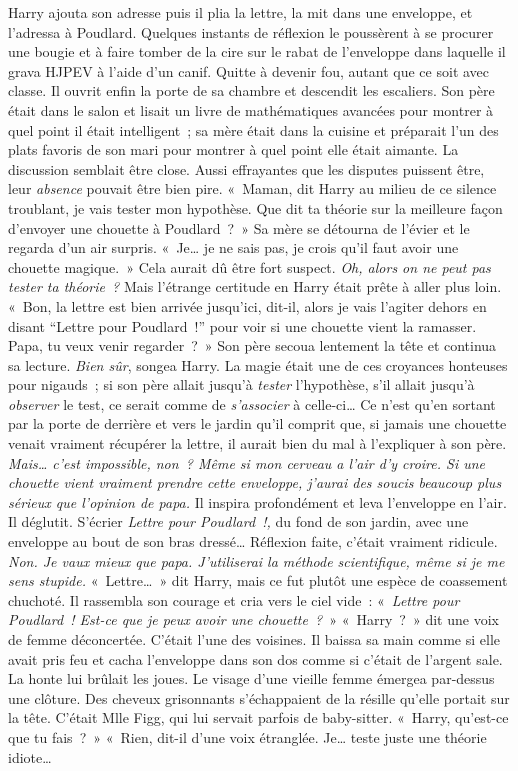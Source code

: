 Harry ajouta son adresse puis il plia la lettre, la mit dans une enveloppe, et l'adressa à Poudlard. Quelques instants de réflexion le poussèrent à se procurer une bougie et à faire tomber de la cire sur le rabat de l'enveloppe dans laquelle il grava HJPEV à l'aide d'un canif. Quitte à devenir fou, autant que ce soit avec classe.
Il ouvrit enfin la porte de sa chambre et descendit les escaliers. Son père était dans le salon et lisait un livre de mathématiques avancées pour montrer à quel point il était intelligent~; sa mère était dans la cuisine et préparait l'un des plats favoris de son mari pour montrer à quel point elle était aimante. La discussion semblait être close. Aussi effrayantes que les disputes puissent être, leur \emph{absence} pouvait être bien pire.
«~Maman, dit Harry au milieu de ce silence troublant, je vais tester mon hypothèse. Que dit ta théorie sur la meilleure façon d'envoyer une chouette à Poudlard~?~»
Sa mère se détourna de l'évier et le regarda d'un air surpris. «~Je… je ne sais pas, je crois qu'il faut avoir une chouette magique.~»
Cela aurait dû être fort suspect. \emph{Oh, alors on ne peut pas tester ta théorie~?} Mais l'étrange certitude en Harry était prête à aller plus loin.
«~Bon, la lettre est bien arrivée jusqu'ici, dit-il, alors je vais l'agiter dehors en disant “Lettre pour Poudlard~!” pour voir si une chouette vient la ramasser. Papa, tu veux venir regarder~?~»
Son père secoua lentement la tête et continua sa lecture. \emph{Bien sûr}, songea Harry. La magie était une de ces croyances honteuses pour nigauds~; si son père allait jusqu'à \emph{tester} l'hypothèse, s'il allait jusqu'à \emph{observer} le test, ce serait comme de \emph{s'associer} à celle-ci…
Ce n'est qu'en sortant par la porte de derrière et vers le jardin qu'il comprit que, si jamais une chouette venait vraiment récupérer la lettre, il aurait bien du mal à l'expliquer à son père.
\emph{Mais… c'est impossible, non~? Même si mon cerveau a l'air d'y croire. Si une chouette vient vraiment prendre cette enveloppe, j'aurai des soucis beaucoup plus sérieux que l'opinion de papa.}
Il inspira profondément et leva l'enveloppe en l'air.
Il déglutit.
S'écrier \emph{Lettre pour Poudlard~!,} du fond de son jardin, avec une enveloppe au bout de son bras dressé… Réflexion faite, c'était vraiment ridicule.
\emph{Non. Je vaux mieux que papa. J'utiliserai la méthode scientifique, même si je me sens stupide.}
«~Lettre…~» dit Harry, mais ce fut plutôt une espèce de coassement chuchoté.
Il rassembla son courage et cria vers le ciel vide~: «~\emph{Lettre pour Poudlard~! Est-ce que je peux avoir une chouette~?}~»
«~Harry~?~» dit une voix de femme déconcertée. C'était l'une des voisines.
Il baissa sa main comme si elle avait pris feu et cacha l'enveloppe dans son dos comme si c'était de l'argent sale. La honte lui brûlait les joues.
Le visage d'une vieille femme émergea par-dessus une clôture. Des cheveux grisonnants s'échappaient de la résille qu'elle portait sur la tête. C'était Mlle Figg, qui lui servait parfois de baby-sitter. «~Harry, qu'est-ce que tu fais~?~»
«~Rien, dit-il d'une voix étranglée. Je… teste juste une théorie idiote…

